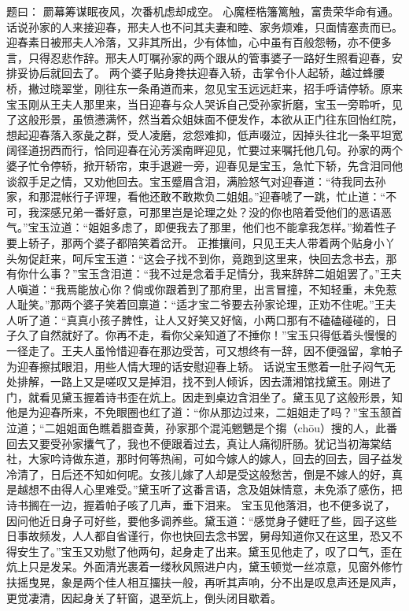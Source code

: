 \documentclass[12pt,oneside]{book}
\begin{document}
题曰：
罽幕筹谋眠夜风，次番机虑却成空。
心魔桎梏籓篱触，富贵荣华命有通。
话说孙家的人来接迎春，邢夫人也不问其夫妻和睦、家务烦难，只面情塞责而已。迎春素日被邢夫人冷落，又非其所出，少有体恤，心中虽有百般怨畅，亦不便多言，只得忍悲作辞。邢夫人叮嘱孙家的两个跟从的管事婆子一路好生照看迎春，安排妥协后就回去了。
两个婆子贴身搀扶迎春入轿，击掌令仆人起轿，越过蜂腰桥，撇过晓翠堂，刚往东一条甬道而来，忽见宝玉远远赶来，招手呼请停轿。原来宝玉刚从王夫人那里来，当日迎春与众人哭诉自己受孙家折磨，宝玉一旁聆听，见了这般形景，虽愤懑满怀，然当着众姐妹面不便发作，本欲从正门往东回怡红院，想起迎春落入豕彘之群，受人凌磨，忿怨难抑，低声啜泣，因掉头往北一条平坦宽阔径道拐西而行，恰同迎春在沁芳溪南畔迎见，忙要过来嘱托他几句。孙家的两个婆子忙令停轿，掀开轿帘，束手退避一旁，迎春见是宝玉，急忙下轿，先含泪同他谈叙手足之情，又劝他回去。宝玉蹙眉含泪，满脸怒气对迎春道：“待我同去孙家，和那混帐行子评理，看他还敢不敢欺负二姐姐。”迎春唬了一跳，忙止道：“不可，我深感兄弟一番好意，可那里岂是论理之处？没的你也陪着受他们的恶语恶气。”宝玉泣道：“姐姐多虑了，即便我去了那里，他们也不能拿我怎样。”拗着性子要上轿子，那两个婆子都陪笑着岔开。
正推攘间，只见王夫人带着两个贴身小丫头匆促赶来，呵斥宝玉道：“这会子找不到你，竟跑到这里来，快回去念书去，那有你什么事？”宝玉含泪道：“我不过是念着手足情分，我来辞辞二姐姐罢了。”王夫人嗔道：“我焉能放心你？倘或你跟着到了那府里，出言冒撞，不知轻重，未免惹人耻笑。”那两个婆子笑着回禀道：“适才宝二爷要去孙家论理，正劝不住呢。”王夫人听了道：“真真小孩子脾性，让人又好笑又好恼，小两口那有不磕磕碰碰的，日子久了自然就好了。你再不走，看你父亲知道了不捶你！”宝玉只得低着头慢慢的一径走了。王夫人虽怜惜迎春在那边受苦，可又想终有一辞，因不便强留，拿帕子为迎春擦拭眼泪，用些人情大理的话安慰迎春上轿。
话说宝玉憋着一肚子闷气无处排解，一路上又是嗟叹又是掉泪，找不到人倾诉，因去潇湘馆找黛玉。刚进了门，就看见黛玉握着诗书歪在炕上。因走到桌边含泪坐了。黛玉见了这般形景，知他是为迎春所来，不免眼圈也红了道：“你从那边过来，二姐姐走了吗？”宝玉颔首泣道；“二姐姐面色瞧着腊查黄，孙家那个混沌魍魉是个搊（chōu）搜的人，此番回去又要受孙家攮气了，我也不便跟着过去，真让人痛彻肝肠。犹记当初海棠结社，大家吟诗做东道，那时何等热闹，可如今嫁人的嫁人，回去的回去，园子益发冷清了，日后还不知如何呢。女孩儿嫁了人却是受这般愁苦，倒是不嫁人的好，真是越想不由得人心里难受。”黛玉听了这番言语，念及姐妹情意，未免添了感伤，把诗书搁在一边，握着帕子咳了几声，垂下泪来。
宝玉见他落泪，也不便多说了，因问他近日身子可好些，要他多调养些。黛玉道：“感觉身子健旺了些，园子这些日事故频发，人人都自省谨行，你也快回去念书罢，舅母知道你又在这里，恐又不得安生了。”宝玉又劝慰了他两句，起身走了出来。黛玉见他走了，叹了口气，歪在炕上只是发呆。外面清光裹着一缕秋风照进户内，黛玉顿觉一丝凉意，见窗外修竹扶摇曳晃，象是两个佳人相互㩅扶一般，再听其声响，分不出是叹息声还是风声，更觉凄清，因起身关了轩窗，退至炕上，倒头闭目歇着。
\end{document}
